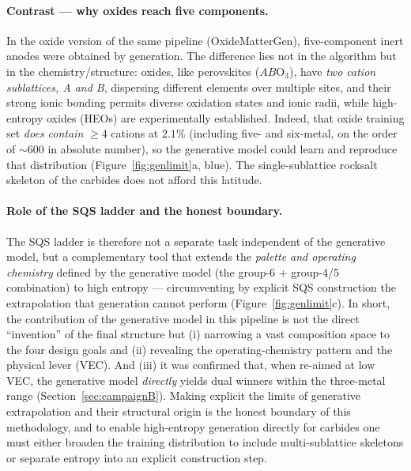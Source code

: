 \documentclass[11pt,a4paper]{report}
\begin{document}
\paragraph{Contrast --- why oxides reach five components.} In the oxide version of the same pipeline
(OxideMatterGen), five-component inert anodes were obtained by generation. The difference lies not in the
algorithm but in the chemistry/structure: oxides, like perovskites ($AB\mathrm{O_3}$), have \emph{two cation
sublattices, A and B}, dispersing different elements over multiple sites, and their strong ionic bonding permits
diverse oxidation states and ionic radii, while high-entropy oxides (HEOs) are experimentally established.
Indeed, that oxide training set \emph{does contain} $\ge\!4$ cations at $2.1\%$ (including five- and six-metal, on
the order of $\sim\!600$ in absolute number), so the generative model could learn and reproduce that distribution
(Figure~\ref{fig:genlimit}a, blue). The single-sublattice rocksalt skeleton of the carbides does not afford this
latitude.

\paragraph{Role of the SQS ladder and the honest boundary.} The SQS ladder is therefore not a separate task
independent of the generative model, but a complementary tool that extends the \emph{palette and operating
chemistry} defined by the generative model (the group-6 + group-4/5 combination) to high entropy --- circumventing
by explicit SQS construction the extrapolation that generation cannot perform (Figure~\ref{fig:genlimit}c). In
short, the contribution of the generative model in this pipeline is not the direct ``invention'' of the final
structure but (i) narrowing a vast composition space to the four design goals and (ii) revealing the operating-chemistry
pattern and the physical lever (VEC). And (iii) it was confirmed that, when re-aimed at low VEC, the generative model
\emph{directly} yields dual winners within the three-metal range (Section~\ref{sec:campaignB}). Making explicit the
limits of generative extrapolation and their structural origin is the honest boundary of this methodology, and to
enable high-entropy generation directly for carbides one must either broaden the training distribution to include
multi-sublattice skeletons or separate entropy into an explicit construction step.
\end{document}
